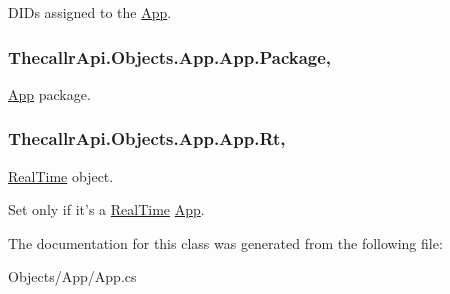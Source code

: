 D\+I\+Ds assigned to the \hyperlink{class_thecallr_api_1_1_objects_1_1_app_1_1_app}{App}. 

\hypertarget{class_thecallr_api_1_1_objects_1_1_app_1_1_app_a019f1ebcc724bfba07689db44ab75622}{
\subsubsection[{Package}]{ Thecallr\+Api.\+Objects.\+App.\+App.\+Package\hspace{0.3cm}{\ttfamily [get]}, {\ttfamily [set]}}}\label{class_thecallr_api_1_1_objects_1_1_app_1_1_app_a019f1ebcc724bfba07689db44ab75622}


\hyperlink{class_thecallr_api_1_1_objects_1_1_app_1_1_app}{App} package. 

\hypertarget{class_thecallr_api_1_1_objects_1_1_app_1_1_app_afd59d20e6ce286c90e3f78a793c5b1f5}{
\subsubsection[{Rt}]{ Thecallr\+Api.\+Objects.\+App.\+App.\+Rt\hspace{0.3cm}{\ttfamily [get]}, {\ttfamily [set]}}}\label{class_thecallr_api_1_1_objects_1_1_app_1_1_app_afd59d20e6ce286c90e3f78a793c5b1f5}


\hyperlink{namespace_thecallr_api_1_1_objects_1_1_real_time}{Real\+Time} object. 

Set only if it's a \hyperlink{namespace_thecallr_api_1_1_objects_1_1_real_time}{Real\+Time} \hyperlink{class_thecallr_api_1_1_objects_1_1_app_1_1_app}{App}.

The documentation for this class was generated from the following file\+:\begin{DoxyCompactItemize}
\item 
Objects/\+App/App.\+cs\end{DoxyCompactItemize}

